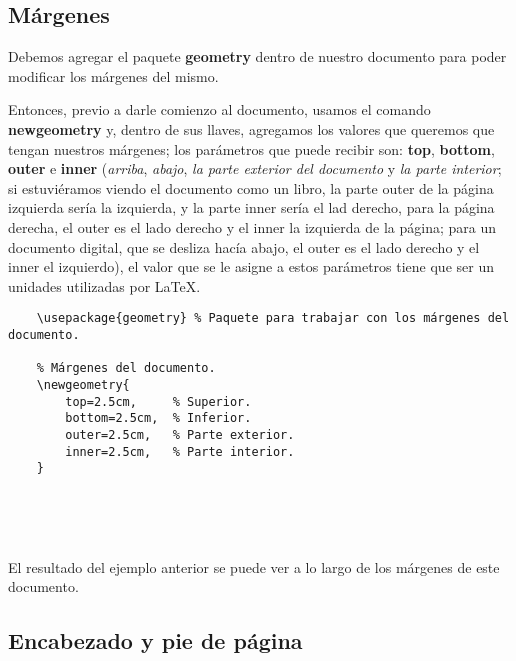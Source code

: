 \subsection{Márgenes}

Debemos agregar el paquete \textbf{geometry} dentro de nuestro documento para poder modificar los márgenes del mismo.

Entonces, previo a darle comienzo al documento, usamos el comando \textbf{newgeometry} y, dentro de sus llaves, agregamos los valores que queremos que tengan nuestros márgenes; los parámetros que puede recibir son: \textbf{top}, \textbf{bottom}, \textbf{outer} e \textbf{inner} (\textit{arriba}, \textit{abajo}, \textit{la parte exterior del documento} y \textit{la parte interior}; si estuviéramos viendo el documento como un libro, la parte outer de la página izquierda sería la izquierda, y la parte inner sería el lad derecho, para la página derecha, el outer es el lado derecho y el inner la izquierda de la página; para un documento digital, que se desliza hacía abajo, el outer es el lado derecho y el inner el izquierdo), el valor que se le asigne a estos parámetros tiene que ser un unidades utilizadas por \LaTeX.
\begin{lstlisting}
    \usepackage{geometry} % Paquete para trabajar con los márgenes del documento.
    
    % Márgenes del documento.
    \newgeometry{
        top=2.5cm,     % Superior.
        bottom=2.5cm,  % Inferior.
        outer=2.5cm,   % Parte exterior.
        inner=2.5cm,   % Parte interior.
    }
    
    
    
    
\end{lstlisting}

El resultado del ejemplo anterior se puede ver a lo largo de los márgenes de este documento.


\subsection{Encabezado y pie de página}

